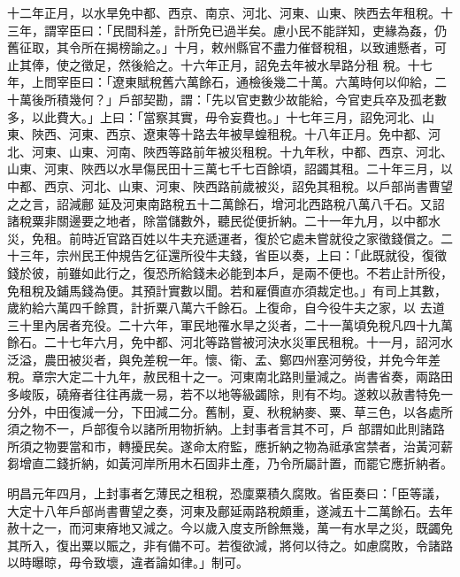 \begin{pinyinscope}
 十二年正月，以水旱免中都、西京、南京、河北、河東、山東、陜西去年租稅。十三年，謂宰臣曰：「民間科差，計所免已過半矣。慮小民不能詳知，吏緣為姦，仍舊征取，其令所在揭榜諭之。」十月，敕州縣官不盡力催督稅租，以致逋懸者，可止其俸，使之徵足，然後給之。十六年正月，詔免去年被水旱路分租
 稅。十七年，上問宰臣曰：「遼東賦稅舊六萬餘石，通檢後幾二十萬。六萬時何以仰給，二十萬後所積幾何？」戶部契勘，謂：「先以官吏數少故能給，今官吏兵卒及孤老數多，以此費大。」上曰：「當察其實，毋令妄費也。」十七年三月，詔免河北、山東、陜西、河東、西京、遼東等十路去年被旱蝗租稅。十八年正月。免中都、河北、河東、山東、河南、陜西等路前年被災租稅。十九年秋，中都、西京、河北、山東、河東、陜西以水旱傷民田十三萬七千七百餘頃，詔蠲其租。二十年三月，以中都、西京、河北、山東、河東、陜西路前歲被災，詔免其租稅。以戶部尚書曹望之之言，詔減鄜
 延及河東南路稅五十二萬餘石，增河北西路稅八萬八千石。又詔諸稅粟非關邊要之地者，除當儲數外，聽民從便折納。二十一年九月，以中都水災，免租。前時近官路百姓以牛夫充遞運者，復於它處未嘗就役之家徵錢償之。二十三年，宗州民王仲規告乞征還所役牛夫錢，省臣以奏，上曰：「此既就役，復徵錢於彼，前雖如此行之，復恐所給錢未必能到本戶，是兩不便也。不若止計所役，免租稅及鋪馬錢為便。其預計實數以聞。若和雇價直亦須裁定也。」有司上其數，歲約給六萬四千餘貫，計折粟八萬六千餘石。上復命，自今役牛夫之家，以
 去道三十里內居者充役。二十六年，軍民地罹水旱之災者，二十一萬頃免稅凡四十九萬餘石。二十七年六月，免中都、河北等路嘗被河決水災軍民租稅。十一月，詔河水泛溢，農田被災者，與免差稅一年。懷、衛、孟、鄭四州塞河勞役，并免今年差稅。章宗大定二十九年，赦民租十之一。河東南北路則量減之。尚書省奏，兩路田多峻阪，磽瘠者往往再歲一易，若不以地等級蠲除，則有不均。遂敕以赦書特免一分外，中田復減一分，下田減二分。舊制，夏、秋稅納麥、粟、草三色，以各處所須之物不一，戶部復令以諸所用物折納。上封事者言其不可，戶
 部謂如此則諸路所須之物要當和市，轉擾民矣。遂命太府監，應折納之物為祗承宮禁者，治黃河薪芻增直二錢折納，如黃河岸所用木石固非土產，乃令所屬計置，而罷它應折納者。



 明昌元年四月，上封事者乞薄民之租稅，恐廩粟積久腐敗。省臣奏曰：「臣等議，大定十八年戶部尚書曹望之奏，河東及鄜延兩路稅頗重，遂減五十二萬餘石。去年赦十之一，而河東瘠地又減之。今以歲入度支所餘無幾，萬一有水旱之災，既蠲免其所入，復出粟以賑之，非有備不可。若復欲減，將何以待之。如慮腐敗，令諸路以時曝晾，毋令致壞，違者論如律。」制可。




\end{pinyinscope}
